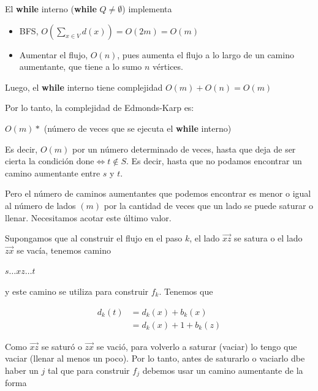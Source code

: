 \documentclass[10pt,a4paper]{article}
\begin{document}
El \textbf{while} interno (\textbf{while} $Q \neq \emptyset$) implementa

\begin{itemize}

	\item BFS, $O(\sum\limits_{x\in V} d(x)) = O(2m) = O(m)$
	\item Aumentar el flujo, $O(n)$, pues aumenta el flujo a lo largo de un camino aumentante, que tiene a lo sumo $n$ vértices.
\end{itemize}

Luego, el \textbf{while} interno tiene complejidad $O(m) + O(n) = O(m)$

Por lo tanto, la complejidad de Edmonds-Karp es:

\begin{center}
$O(m) * $ (número de veces que se ejecuta el \textbf{while} interno)
\end{center}

Es decir, $O(m)$ por un número determinado de veces, hasta que deja de ser cierta la condición $\text{done} \Leftrightarrow t\not \in S$. Es decir, hasta que no podamos encontrar un camino aumentante entre $s$ y $t$.

Pero el número de caminos aumentantes que podemos encontrar es menor o igual al número de lados $(m)$ por la cantidad de veces que un lado se puede saturar o llenar. Necesitamos acotar este último valor.

Supongamos que al construir el flujo en el paso $k$, el lado $\overrightarrow{xz}$ se satura o el lado $\overrightarrow{zx}$ se vacía, tenemos camino

\begin{center}
$s\dots xz\dots t$
\end{center}

y este camino se utiliza para construir $f_k$. Tenemos que

\begin{center}
\begin{align*} d_k(t) &= d_k(x) + b_k(x)\\ &= d_k(x)+1+b_k(z) \end{align*}
\end{center}

Como $\overrightarrow{xz}$ se saturó o $\overrightarrow{zx}$ se vació, para volverlo a saturar (vaciar) lo tengo que vaciar (llenar al menos un poco). Por lo tanto, antes de saturarlo o vaciarlo dbe haber un $j$ tal que para construir $f_j$ debemos usar un camino aumentante de la forma
\end{document}
